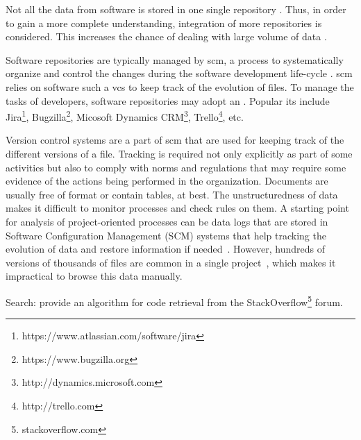 Not all the data from software is stored in one single repository \citep{DBLP:journals/ese/KalliamvakouGBS16}. Thus, in order to gain a more complete understanding, integration of more repositories is considered. 
This increases the chance of dealing with large volume of data \citep{DBLP:journals/tosem/0001NRN15,DBLP:journals/jossw/Boettiger18,DBLP:conf/wcre/BoldiPVZ20}.
 
Software repositories are typically managed by \gls{scm}, a process to systematically organize and control the changes during the software development life-cycle \citep{DBLP:conf/icse/Estublier00}. \Gls{scm} relies on software such a \gls{vcs} to keep track of the evolution of files. 
To manage the tasks of developers, software repositories may adopt an  \citep{DBLP:conf/cscw/BertramVGW10}. Popular \gls{its} include Jira\footnote{https://www.atlassian.com/software/jira}, Bugzilla\footnote{https://www.bugzilla.org}, Micosoft Dynamics CRM\footnote{http://dynamics.microsoft.com}, Trello\footnote{http://trello.com}, etc. 

Version control systems are a part of \gls{scm} that are used for keeping track of the different versions of a file. 
Tracking is required not only explicitly as part of some activities but also to comply with norms and regulations that may require some evidence of the actions being performed in the organization. Documents are usually free of format or contain tables, at best. The unstructuredness of data makes it difficult to monitor processes and check rules on them. A starting point for analysis of project-oriented processes can be data logs %
that are stored in Software Configuration Management (SCM) systems that help tracking the evolution of data and restore information if needed~\citep{voinea_open_2006}.
However, hundreds of versions of thousands of files are common in a single project~\citep{voinea_multiscale_2006}, which makes it impractical to browse this data manually.


Search:
\citep{DBLP:journals/spe/HuPZXGY20} provide an algorithm for code retrieval from the StackOverflow\footnote{stackoverflow.com} forum.

